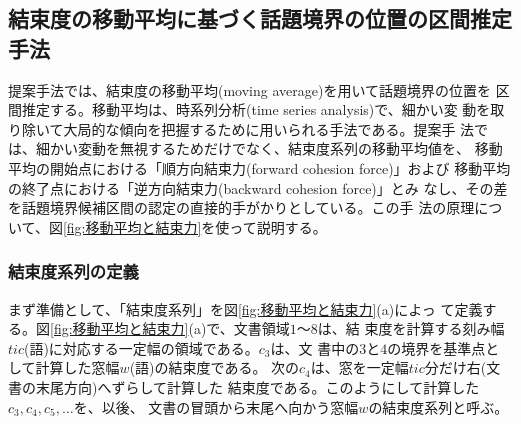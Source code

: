 \subsection{結束度の移動平均に基づく話題境界の位置の区間推定手法}
\label{sect:話題境界の区間推定法}

提案手法では、結束度の移動平均(moving average)を用いて話題境界の位置を
区間推定する。移動平均は、時系列分析(time series analysis)で、細かい変
動を取り除いて大局的な傾向を把握するために用いられる手法である。提案手
法では、細かい変動を無視するためだけでなく、結束度系列の移動平均値を、
移動平均の開始点における「順方向結束力(forward cohesion force)」および
移動平均の終了点における「逆方向結束力(backward cohesion force)」とみ
なし、その差を話題境界候補区間の認定の直接的手がかりとしている。この手
法の原理について、図\ref{fig:移動平均と結束力}を使って説明する。

\subsubsection{結束度系列の定義}

まず準備として、「結束度系列」を図\ref{fig:移動平均と結束力}(a)によっ
て定義する。図\ref{fig:移動平均と結束力}(a)で、文書領域$1$〜$8$は、結
束度を計算する刻み幅$tic$(語)に対応する一定幅の領域である。$c_3$は、文
書中の$3$と$4$の境界を基準点として計算した窓幅$w$(語)の結束度である。
次の$c_4$は、窓を一定幅$tic$分だけ右(文書の末尾方向)へずらして計算した
結束度である。このようにして計算した$c_3, c_4, c_5, \ldots$を、以後、
文書の冒頭から末尾へ向かう窓幅$w$の結束度系列と呼ぶ。

